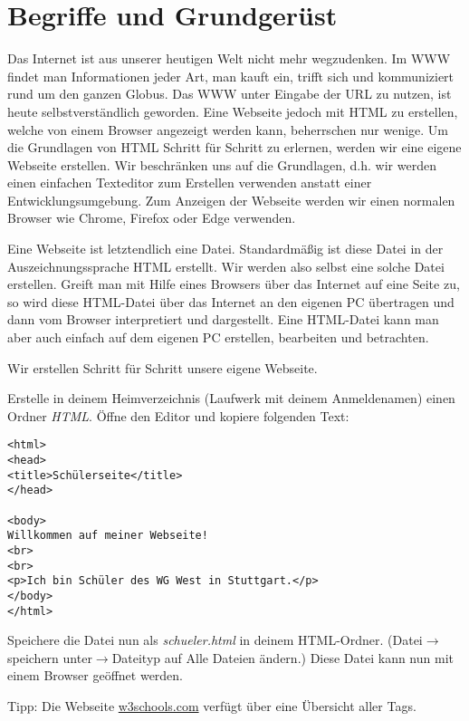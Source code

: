 \section{Begriffe und Grundgerüst}
Das Internet ist aus unserer heutigen Welt nicht mehr wegzudenken. Im WWW findet man Informationen jeder Art, man kauft ein, trifft sich und kommuniziert rund um den ganzen Globus.  Das WWW unter Eingabe der URL zu nutzen, ist heute selbstverständlich geworden. Eine Webseite jedoch mit HTML zu erstellen, welche von einem Browser angezeigt werden kann, beherrschen nur wenige. Um die Grundlagen von HTML Schritt für Schritt zu erlernen, werden wir eine eigene Webseite erstellen. Wir beschränken uns auf die Grundlagen, d.h. wir werden einen einfachen Texteditor zum Erstellen verwenden anstatt einer Entwicklungsumgebung. Zum Anzeigen der Webseite werden wir einen normalen Browser wie Chrome, Firefox oder Edge verwenden.

Eine Webseite ist letztendlich eine Datei. Standardmäßig ist diese Datei in der Auszeichnungssprache HTML erstellt. Wir werden also selbst eine solche Datei erstellen. Greift man mit Hilfe eines Browsers über das Internet auf eine Seite zu, so wird diese HTML-Datei über das Internet an den eigenen PC übertragen und dann vom Browser interpretiert und dargestellt. Eine HTML-Datei kann man aber auch einfach auf dem eigenen PC erstellen, bearbeiten und betrachten.

\begin{Exercise}[title=Für was steht die Abkürzung HTML und was versteht man unter dem Begriff einer Auszeichnungssprache? Die Begriffe maschinenlesbare Sprache und Tag sind hier besonders wichtig., label=Auszeichnungssprache]
\end{Exercise}

Wir erstellen Schritt für Schritt unsere eigene Webseite.

\begin{Exercise}[title=Erstelle deine erste Webseite., label=DateiErstellen]

    Erstelle in deinem Heimverzeichnis (Laufwerk mit deinem Anmeldenamen) einen Ordner \textit{HTML}. Öffne den Editor und kopiere folgenden Text:

    \begin{lstlisting}
<html>
<head>
<title>Schülerseite</title>
</head>

<body>
Willkommen auf meiner Webseite!
<br>
<br>
<p>Ich bin Schüler des WG West in Stuttgart.</p>
</body>
</html>
    \end{lstlisting}
    Speichere die Datei nun als \textit{schueler.html} in deinem HTML-Ordner. (Datei\(\rightarrow\)speichern unter\(\rightarrow\)Dateityp auf Alle Dateien ändern.)
    Diese Datei kann nun mit einem Browser geöffnet werden.
\end{Exercise}

\begin{Exercise}[title=Recherchiere die Funktion der oben verwendeten Tags., label=Tags]

    Tipp: Die Webseite \href{https://www.w3schools.com/tags/default.asp}{w3schools.com} verfügt über eine Übersicht aller Tags.
\end{Exercise}

